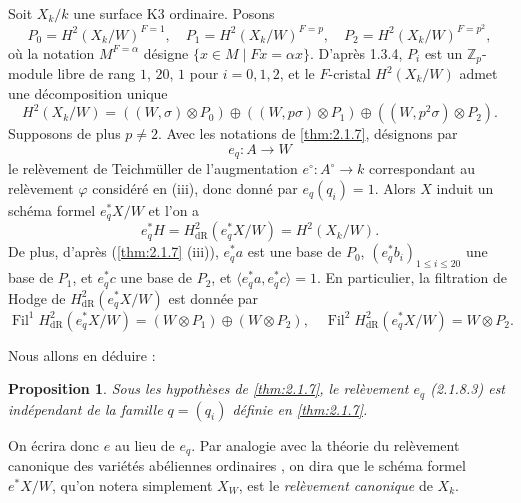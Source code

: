 \documentclass[12pt,a4paper]{article}
\theoremstyle{plain}
\newtheorem{proposition}[theorem]{Proposition}
\theoremstyle{definition}
\theoremstyle{remark}
\DeclareMathOperator{\Fil}{Fil}
\begin{document}
\subsubsection{}
Soit $X_k/k$ une surface K3 ordinaire. Posons
\begin{equation}\tag{2.1.8.1}
P_0 = H^2(X_k/W)^{F=1}, \quad P_1 = H^2(X_k/W)^{F=p}, \quad P_2 = H^2(X_k/W)^{F=p^2}, 
\end{equation}
o\`u la notation $M^{F=\alpha}$ d\'esigne $\{x \in M \mid Fx = \alpha x\}$. D'apr\`es 1.3.4, $P_i$ est un $\mathbb{Z}_p$-module libre de rang $1$, $20$, $1$ pour $i = 0, 1, 2$, et le $F$-cristal $H^2(X_k/W)$ admet une d\'ecomposition unique
\begin{equation}\tag{2.1.8.2}
H^2(X_k/W) = ((W, \sigma) \otimes P_0) \oplus ((W, p\sigma) \otimes P_1) \oplus ((W, p^2\sigma) \otimes P_2). 
\end{equation}
Supposons de plus $p \neq 2$. Avec les notations de \ref{thm:2.1.7}, d\'esignons par
\begin{equation}\tag{2.1.8.3}
e_q : A \longrightarrow W 
\end{equation}
le rel\`evement de Teichm\"uller de l'augmentation $e^\circ : A^\circ \to k$ correspondant au rel\`evement $\varphi$ consid\'er\'e en (iii), donc donn\'e par $e_q(q_i) = 1$. Alors $X$ induit un sch\'ema formel $e_q^*X/W$ et l'on a
\begin{equation}\tag{2.1.8.4}
e_q^* H = H^2_\mathrm{dR}(e_q^*X/W) = H^2(X_k/W). 
\end{equation}
De plus, d'apr\`es (\ref{thm:2.1.7} (iii)), $e_q^* a$ est une base de $P_0$, $(e_q^* b_i)_{1\leqslant i\leqslant 20}$ une base de $P_1$, et $e_q^* c$ une base de $P_2$, et $\langle e_q^* a, e_q^* c \rangle = 1$. En particulier, la filtration de Hodge de $H^2_\mathrm{dR}(e_q^*X/W)$ est donn\'ee par
\begin{equation}\tag{2.1.8.5}
\Fil^1 H^2_\mathrm{dR}(e_q^*X/W) = (W \otimes P_1) \oplus (W \otimes P_2), \quad \Fil^2 H^2_\mathrm{dR}(e_q^*X/W) = W \otimes P_2. 
\end{equation}

Nous allons en d\'eduire :

\begin{proposition}\label{prop:2.1.9}
Sous les hypoth\`eses de \ref{thm:2.1.7}, le rel\`evement $e_q$ (2.1.8.3) est ind\'ependant de la famille $q = (q_i)$ d\'efinie en \ref{thm:2.1.7}.
\end{proposition}

On \'ecrira donc $e$ au lieu de $e_q$. Par analogie avec la th\'eorie du rel\`evement canonique des vari\'et\'es ab\'eliennes ordinaires \cite[\S V \S 3]{Messing}, on dira que le sch\'ema formel $e^*X/W$, qu'on notera simplement $X_W$, est le \emph{rel\`evement canonique} de $X_k$.
\end{document}
